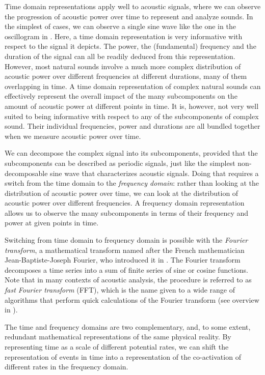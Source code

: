 Time domain representations apply well to acoustic signals, where we can observe the progression of acoustic power over time to represent and analyze sounds.
In the simplest of cases, we can observe a single sine wave like the one in the oscillogram in . Here, a time domain representation is very informative with respect to the signal it depicts. The power, the (fundamental) frequency and the duration of the signal can all be readily deduced from this representation.
However, most natural sounds involve a much more complex distribution of acoustic power over different frequencies at different durations, many of them overlapping in time.
A time domain representation of complex natural sounds can effectively represent the overall impact of the many subcomponents on the amount of acoustic power at different points in time. It is, however, not very well suited to being informative with respect to any of the subcomponents of complex sound. Their individual frequencies, power and durations are all bundled together when we measure acoustic power over time.

We can decompose the complex signal into its subcomponents, provided that the subcomponents can be described as periodic signals, just like the simplest non-decomposable sine wave that characterizes acoustic signals. Doing that requires a switch from the time domain to the \emph{frequency domain}: rather than looking at the distribution of acoustic power over time, we can look at the distribution of acoustic power over different frequencies. A frequency domain representation allows us to observe the many subcomponents in terms of their frequency and power at given points in time.

Switching from time domain to frequency domain is possible with the \emph{Fourier transform}, a mathematical transform named after the French mathematician Jean-Baptiste-Joseph Fourier, who introduced it in \citet{fourier1822theoriesk}.
The Fourier transform decomposes a time series into a sum of finite series of sine or cosine functions.
Note that in many contexts of acoustic analysis, the procedure is referred to as \emph{fast Fourier transform} (FFT), which is the name given to a wide range of algorithms that perform quick calculations of the Fourier transform (see overview in \citealt{brigham1988fastsk}).

The time and frequency domains are two complementary, and, to some extent, redundant mathematical representations of the same physical reality.
By representing time as a scale of different potential rates, we can shift the representation of events in time into a representation of the co-activation of different rates in the frequency domain.


